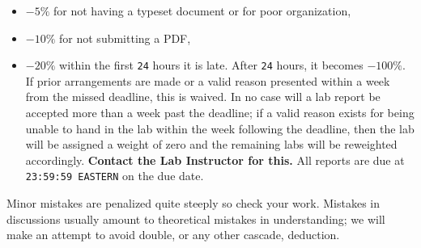 \begin{itemize}
  \item{
    \(-5\%\) for not having a typeset document or for poor organization,
  }
  \item{
    \(-10\%\) for not submitting a PDF,
  }
  \item{
    \(-20\%\) within the first \texttt{24} hours it is late. After
    \texttt{24} hours, it becomes \(-100\%.\) If prior arrangements are made
    or a valid reason presented within a week from the missed deadline, this
    is waived. In no case will a lab report be accepted more than a week past
    the deadline; if a valid reason exists for being unable to hand in the lab
    within the week following the deadline, then the lab will be assigned a
    weight of zero and the remaining labs will be reweighted accordingly.
    \textbf{Contact the Lab Instructor for this.}
    All reports are due at \texttt{23:59:59 EASTERN} on the due date.
  }
\end{itemize}
%
%
Minor mistakes are penalized quite steeply so check your work.
Mistakes in discussions usually amount to theoretical mistakes in understanding;
we will make an attempt to avoid double, or any other cascade, deduction.

